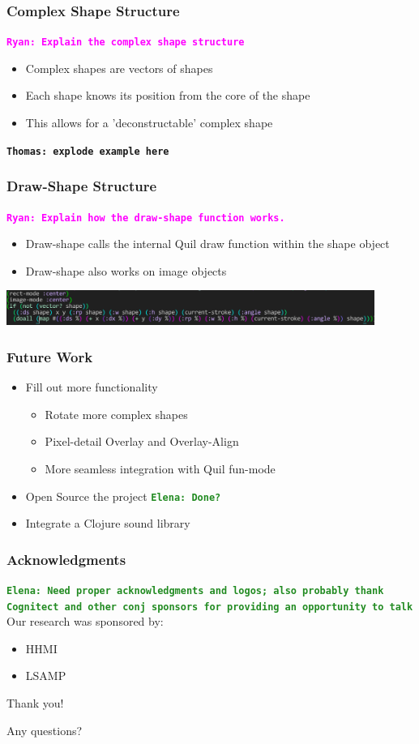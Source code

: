 \documentclass{beamer}
\newcommand{\comment}[1]{{\bf \tt  {#1}}}
\newcommand{\emcomment}[1]{\textcolor{ForestGreen}{\comment{Elena: {#1}}}}
\newcommand{\thcomment}[1]{\textcolor{BestBlue}{\comment{Thomas: {#1}}}}
\newcommand{\rmcomment}[1]{\textcolor{magenta}{\comment{Ryan: {#1}}}}
\begin{document}
\begin{frame}
\frametitle{Complex Shape Structure}
\rmcomment{Explain the complex shape structure}
	\begin{itemize}
		\item Complex shapes are vectors of shapes
		\item Each shape knows its position from the core of the shape
		\item This allows for a 'deconstructable' complex shape
	\end{itemize}
	\thcomment{explode example here}
\end{frame}

\begin{frame}
\frametitle{Draw-Shape Structure}
\rmcomment{Explain how the draw-shape function works.}
	\begin{itemize}
		\item Draw-shape calls the internal Quil draw function within the shape object
		\item Draw-shape also works on image objects
	\end{itemize}
	\includegraphics[width=12cm]{PresentationImages/dsCode.png}
\end{frame}

\begin{frame}
	\frametitle{Future Work}
	\begin{itemize}
		\item Fill out more functionality
		\begin{itemize}
			\item Rotate more complex shapes
			\item Pixel-detail Overlay and Overlay-Align
			\item More seamless integration with Quil fun-mode
		\end{itemize}
		\item Open Source the project \emcomment{Done?}
		\item Integrate a Clojure sound library
	\end{itemize}
\end{frame}

\begin{frame}
\frametitle{Acknowledgments}
\emcomment{Need proper acknowledgments and logos; also probably thank Cognitect and other conj sponsors for providing an opportunity to talk}
	Our research was sponsored by:
	\begin{itemize}
	\item HHMI
	\item LSAMP
	\end{itemize}
	{\centering
	\noindent
	Thank you! \par
	Any questions? \par
	}
\end{frame}
\end{document}
